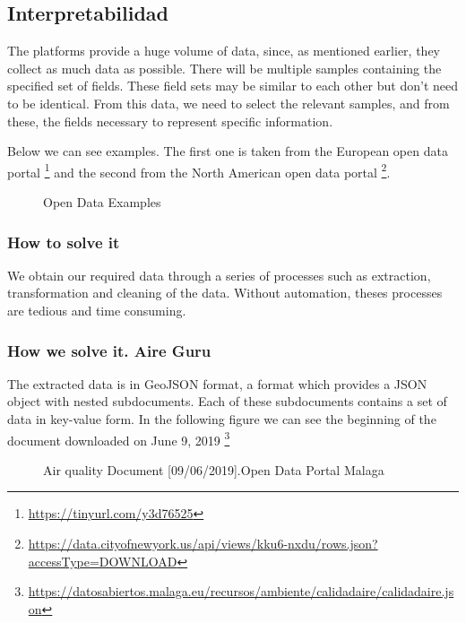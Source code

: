 \subsection{Interpretabilidad}
The platforms provide a huge volume of data, since, as mentioned earlier, they collect as much data as possible.
There will be multiple samples containing the specified set of fields. These field sets may be similar to each other but don't need to be identical.
From this data, we need to select the relevant samples, and from these, the fields necessary to represent specific information.


Below we can see examples. The first one is taken from the European open data portal
\footnote{\url{https://tinyurl.com/y3d76525}} and the second from the North American open data portal
\footnote{\url{https://data.cityofnewyork.us/api/views/kku6-nxdu/rows.json?accessType=DOWNLOAD}}.

\begin{figure}[h]
    \centering
    \hfill
    \caption{Open Data Examples}
\end{figure}

    

    
\subsubsection{How to solve it} 
We obtain our required data through a series of processes such as extraction, transformation and
cleaning of the data. Without automation, theses processes are tedious and time consuming. 

\subsubsection{How we solve it. Aire Guru} 

The extracted data is in GeoJSON format, a format which provides a JSON object with nested subdocuments. Each of these
subdocuments contains a set of data in key-value form.
In the following figure we can see the beginning of the document downloaded on June 9, 2019
\footnote{\url{https://datosabiertos.malaga.eu/recursos/ambiente/calidadaire/calidadaire.json}}\\
\newpage
\begin{figure}[h]
    \centering
   \hfill
 
    \caption{Air quality Document [09/06/2019].Open Data Portal Malaga}
    \end{figure}
    
